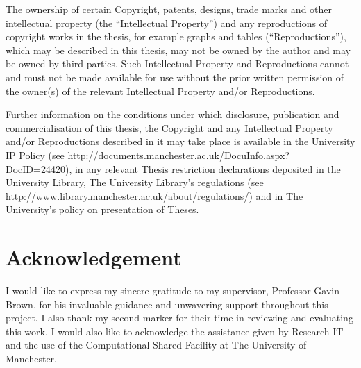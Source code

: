 \documentclass[draft]{article}
\begin{document}
The ownership of certain Copyright, patents, designs, trade marks and other intellectual property (the ``Intellectual Property'') and any reproductions of copyright works in the thesis, for example graphs and tables (``Reproductions''), which may be described in this thesis, may not be owned by the author and may be owned by third parties. Such Intellectual Property and Reproductions cannot and must not be made available for use without the prior written permission of the owner(s) of the relevant Intellectual Property and/or Reproductions. 

Further information on the conditions under which disclosure, publication and commercialisation of this thesis, the Copyright and any Intellectual Property and/or Reproductions described in it may take place is available in the University IP Policy (see \url{http://documents.manchester.ac.uk/DocuInfo.aspx?DocID=24420}), in any relevant Thesis restriction declarations deposited in the University Library, The University Library's regulations (see \url{http://www.library.manchester.ac.uk/about/regulations/}) and in The University's policy on presentation of Theses. 


\section*{Acknowledgement}
I would like to express my sincere gratitude to my supervisor, Professor Gavin Brown, for his invaluable guidance and unwavering support throughout this project. I also thank my second marker for their time in reviewing and evaluating this work. 
I would also like to acknowledge the assistance given by Research IT and the use of the Computational Shared Facility at The University of Manchester. 





\setcounter{section}{0}















\end{document}
